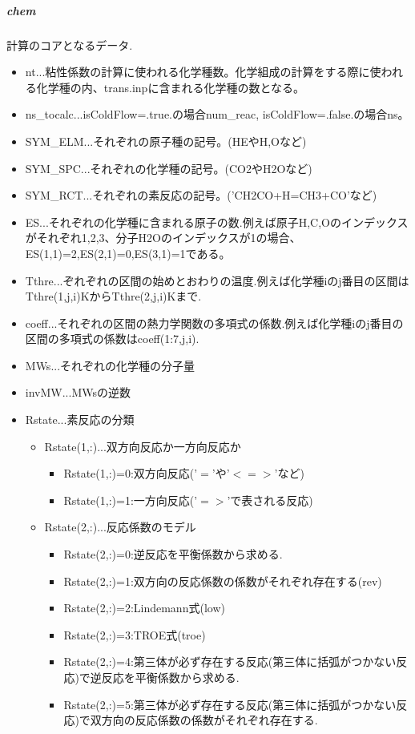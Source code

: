 \documentclass{jsarticle}
\begin{document}
\subparagraph{chem}計算のコアとなるデータ.
\begin{itemize}
\item nt...粘性係数の計算に使われる化学種数。化学組成の計算をする際に使われる化学種の内、trans.inpに含まれる化学種の数となる。
\item ns\_tocalc...isColdFlow=.true.の場合num\_reac, isColdFlow=.false.の場合ns。
\item SYM\_ELM...それぞれの原子種の記号。(HEやH,Oなど)
\item SYM\_SPC...それぞれの化学種の記号。(CO2やH2Oなど)
\item SYM\_RCT...それぞれの素反応の記号。('CH2CO+H=CH3+CO'など)
\item ES...それぞれの化学種に含まれる原子の数.例えば原子H,C,Oのインデックスがそれぞれ1,2,3、分子H2Oのインデックスが1の場合、ES(1,1)=2,ES(2,1)=0,ES(3,1)=1である。
\item Tthre...ぞれぞれの区間の始めとおわりの温度.例えば化学種iのj番目の区間はTthre(1,j,i)KからTthre(2,j,i)Kまで.
\item coeff...それぞれの区間の熱力学関数の多項式の係数.例えば化学種iのj番目の区間の多項式の係数はcoeff(1:7,j,i).
\item MWs...それぞれの化学種の分子量
\item invMW...MWsの逆数
\item Rstate...素反応の分類
\begin{itemize}
\item Rstate(1,:)...双方向反応か一方向反応か
\begin{itemize}
\item Rstate(1,:)=0:双方向反応('$=$'や'$<=>$'など)
\item Rstate(1,:)=1:一方向反応('$=>$'で表される反応)
\end{itemize}
\item Rstate(2,:)...反応係数のモデル
\begin{itemize}
\item Rstate(2,:)=0:逆反応を平衡係数から求める.
\item Rstate(2,:)=1:双方向の反応係数の係数がそれぞれ存在する(rev)
\item Rstate(2,:)=2:Lindemann式(low)
\item Rstate(2,:)=3:TROE式(troe)
\item Rstate(2,:)=4:第三体が必ず存在する反応(第三体に括弧がつかない反応)で逆反応を平衡係数から求める.
\item Rstate(2,:)=5:第三体が必ず存在する反応(第三体に括弧がつかない反応)で双方向の反応係数の係数がそれぞれ存在する.

\end{itemize}
\end{itemize}
\end{itemize}
\end{document}

